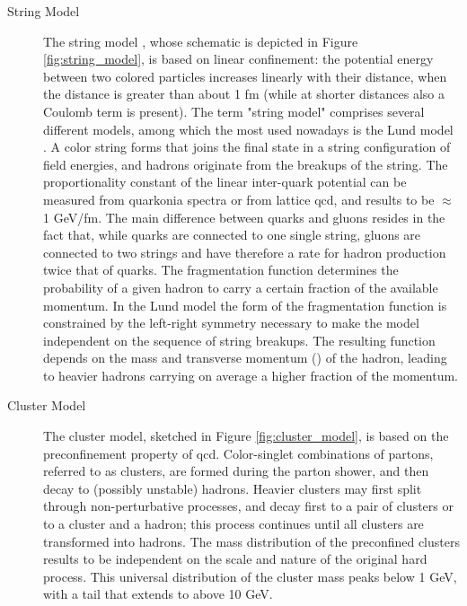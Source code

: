 \begin{description}
\item[String Model] The string model \cite{Artru:1974hr}, whose schematic is depicted in Figure \ref{fig:string_model}, is based on linear confinement: the potential energy between two colored particles increases linearly with their distance, when the distance is greater than about 1 fm (while at shorter distances also a Coulomb term is present). The term "string model" comprises several different models, among which the most used nowadays is the Lund model \cite{Andersson:1983ia,Andersson:1998tv}. 
A color string forms that joins the final state in a string configuration of field energies, and hadrons originate from the breakups of the string. The proportionality constant of the linear inter-quark potential can be measured from quarkonia spectra or from lattice \gls{qcd}, and results to be $\approx$ 1 GeV/fm.
The main difference between quarks and gluons resides in the fact that, while quarks are connected to one single string, gluons are connected to two strings and have therefore a rate for hadron production twice that of quarks. 
The fragmentation function determines the probability of a given hadron to carry a certain fraction of the available momentum. In the Lund model the form of the fragmentation function is constrained by the left-right symmetry necessary to make the model independent on the sequence of string breakups. The resulting function depends on the mass and transverse momentum (\pt) of the hadron, leading to heavier hadrons carrying on average a higher fraction of the momentum.

\item[Cluster Model] The cluster model, sketched in Figure \ref{fig:cluster_model}, is based on the preconfinement property of \gls{qcd}. 
Color-singlet combinations of partons, referred to as clusters, are formed during the parton shower,  
and then decay to (possibly unstable) hadrons. 
Heavier clusters may first split through non-perturbative processes, and decay first to a pair of clusters or to a cluster and a hadron; 
this process continues until all clusters are transformed into hadrons. 
The mass distribution of the preconfined clusters results to be independent on the scale and nature of the original hard process. This universal distribution of the cluster mass peaks below 1 GeV, with a tail that extends to above 10 GeV.

\end{description}

